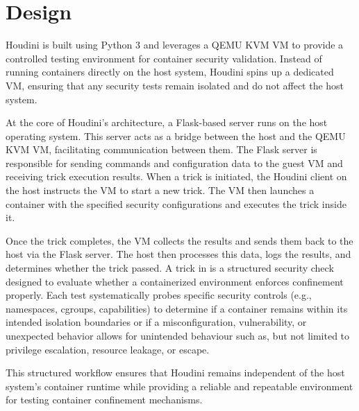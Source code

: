 \section{Design}

Houdini is built using Python 3 and leverages a QEMU KVM VM to provide a controlled testing environment for container security validation. Instead of running containers directly on the host system, Houdini spins up a dedicated VM, ensuring that any security tests remain isolated and do not affect the host system.

At the core of Houdini’s architecture, a Flask-based server runs on the host operating system. This server acts as a bridge between the host and the QEMU KVM VM, facilitating communication between them. The Flask server is responsible for sending commands and configuration data to the guest VM and receiving trick execution results. When a trick is initiated, the Houdini client on the host instructs the VM to start a new trick. The VM then launches a container with the specified security configurations and executes the trick inside it.  

Once the trick completes, the VM collects the results and sends them back to the host via the Flask server. The host then processes this data, logs the results, and determines whether the trick passed. A trick in \houdini is a structured security check designed to evaluate whether a containerized environment enforces confinement properly. Each test systematically probes specific security controls (e.g., namespaces, cgroups, capabilities) to determine if a container remains within its intended isolation boundaries or if a misconfiguration, vulnerability, or unexpected behavior allows for unintended behaviour such as, but not limited to privilege escalation, resource leakage, or escape.

 This structured workflow ensures that Houdini remains independent of the host system’s container runtime while providing a reliable and repeatable environment for testing container confinement mechanisms.

